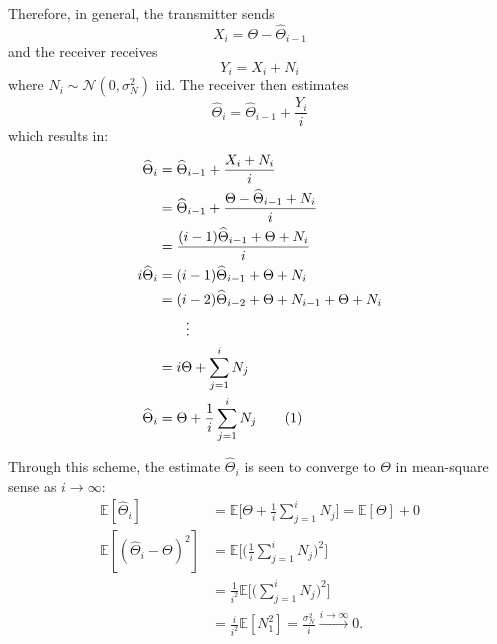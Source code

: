 \documentclass[letterpaper, 10pt, conference]{ieeeconf}
\newcommand\numberthis{\stepcounter{equation}\tag{\theequation}}
\begin{document}
Therefore, in general, the transmitter sends
\begin{equation}
	X_i = \Theta - \widehat\Theta_{i-1} \label{eq:tx-x-noiseless}
\end{equation}
and the receiver receives
\begin{equation}
	Y_i = X_i + N_i
\end{equation}
where $N_i \sim \mathcal{N}(0, \sigma_N^2)$ iid. The receiver then estimates
\begin{equation}
	\widehat\Theta_i = \widehat\Theta_{i-1} + \frac{Y_i}{i} \label{eq:rx-thetahat-noiseless}
\end{equation}
which results in:
\begin{align*}
	\widehat{\Theta}_{i}  &= \widehat{\Theta}_{i-1}+\frac{X_{i}+N_{i}}{i} \\
					  &= \widehat{\Theta}_{i-1}+\frac{\Theta-\widehat{\Theta}_{i-1}+N_{i}}{i} \\
					  &= \frac{(i-1)\widehat{\Theta}_{i-1}+\Theta+N_{i}}{i} \\
	i\widehat{\Theta}_{i} &= (i-1)\widehat{\Theta}_{i-1}+\Theta+N_{i} \\
					  &=(i-2)\widehat{\Theta}_{i-2}+\Theta+N_{i-1}+\Theta+N_{i} \\
					  & \qquad \vdots \\
					  &= i\Theta+\sum_{j=1}^{i}N_{j} \\
	\widehat{\Theta}_{i}  &=\Theta+\frac{1}{i}\sum_{j=1}^{i}N_{j} \numberthis \label{eq:theta_hat_i-noiseless}
\end{align*}

Through this scheme, the estimate $\widehat{\Theta}_{i}$ is seen to converge to $\Theta$ in mean-square sense as $i\rightarrow\infty$:
\begin{align*}
	\mathbb{E}[\widehat{\Theta}_{i}] &= \mathbb{E}\bigg[\Theta+\frac{1}{i}\sum_{j=1}^{i}N_{j}\bigg] = \mathbb{E}[\Theta]+0 \\
	\mathbb{E}[(\widehat{\Theta}_{i}-\Theta)^{2}] &= \mathbb{E}\bigg[\bigg(\frac{1}{i}\sum_{j=1}^{i}N_{j}\bigg)^{2}\bigg] \\
												  &= \frac{1}{i^{2}}\mathbb{E}\bigg[\bigg(\sum_{j=1}^{i}N_{j}\bigg)^{2}\bigg] \\
												  &= \frac{i}{i^{2}}\mathbb{E}[N_{1}^{2}] = \frac{\sigma_{N}^{2}}{i}\overset{i\to\infty}\longrightarrow 0.
\end{align*}

\end{document}
